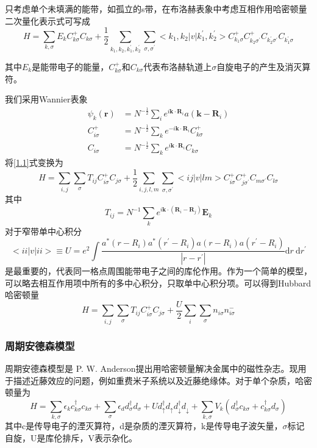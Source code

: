 只考虑单个未填满的能带，如孤立的s带，在布洛赫表象中考虑互相作用哈密顿量二次量化表示式可写成
\begin{equation}
    H=\sum_{k, \sigma} E_{k} C_{k \sigma}^{+} C_{k \sigma}+\frac{1}{2} \sum_{k_{1}, k_{2}, k_{1}^{\prime}, k_{2}^{\prime}} \sum_{\sigma, \sigma^{\prime}}<k_{1}, k_{2}|v| k_{1}^{\prime}, k_{2}^{\prime}>C_{k_{1} \sigma}^{+} C_{k_{2} \sigma^{\prime}}^{+} C_{k^{\prime}_2 \sigma^{\prime}} C_{k^{\prime}_1 \sigma}
    \label{1.1}
\end{equation}

其中$E_k$是能带电子的能量，$C^+_{k \sigma}$和$C_{k \sigma}$代表布洛赫轨道上$\sigma$自旋电子的产生及消灭算符。

我们采用Wannier表象
\begin{align*}
    \psi_k(\textbf{r})&=N^{-\frac{1}{2}}\sum_i e^{i\textbf{k}\cdot \textbf{R}_i} a(\textbf{k} - \textbf{R}_i)\\
    C^+_{i \sigma}&=N^{-\frac{1}{2}} \sum_k e^{- i\textbf{k}\cdot \textbf{R}_i} C^+_{k \sigma}\\
    C_{i \sigma}&=N^{-\frac{1}{2}} \sum_k e^{i\textbf{k}\cdot \textbf{R}_i} C_{k \sigma}
\end{align*}
将\ref{1.1}式变换为
$$
H=\sum_{i, j} \sum_{\sigma} T_{i j} C_{i \sigma}^{+} C_{j \sigma}+\frac{1}{2} \sum_{i, j, l, m} \sum_{\sigma, \sigma^{\prime}}<i j|v| l m>C_{i \sigma}^{+} C_{j \sigma^{\prime}}^{+} C_{m \sigma^{\prime}} C_{l \sigma}
$$
其中
$$T_{ij}=N^{-1}\sum_k e^{i \textbf{k} \cdot (\textbf{R}_i-\textbf{R}_j)}\textbf{E}_k$$
对于窄带单中心积分
$$
<i i|v| i i>\equiv U=e^{2} \int \frac{a^{*}\left(r-R_{i}\right) a^{*}\left(r^{\prime}-R_{i}\right) a\left(r-R_{i}\right) a\left(r^{\prime}-R_{i}\right)}{\left|r-r^{\prime}\right|} \mathrm{d} r \mathrm{~d} r^{\prime}
$$
是最重要的，代表同一格点周围能带电子之间的库伦作用。作为一个简单的模型，可以略去相互作用项中所有的多中心积分，只取单中心积分项。可以得到Hubbard哈密顿量
$$
H=\sum_{i, j} \sum_{\sigma} T_{i j} C_{i \sigma}^{+} C_{j \sigma}+\frac{U}{2} \sum_{i} \sum_{\sigma} n_{i \sigma} n_{i \sigma}^{-}
$$

\subsubsection{周期安德森模型}
周期安德森模型是 P. W. Anderson提出用哈密顿量解决金属中的磁性杂志。现用于描述近藤效应的问题，例如重费米子系统以及近藤绝缘体。对于单个杂质，哈密顿量为
$$
H=\sum_{k, \sigma} \epsilon_{k} c_{k \sigma}^{\dagger} c_{k \sigma}+\sum_{\sigma} \epsilon_{d} d_{\sigma}^{\dagger} d_{\sigma}+U d_{\uparrow}^{\dagger} d_{\uparrow} d_{\downarrow}^{\dagger} d_{\downarrow}+\sum_{k, \sigma} V_{k}\left(d_{\sigma}^{\dagger} c_{k \sigma}+c_{k \sigma}^{\dagger} d_{\sigma}\right)
$$
其中c是传导电子的湮灭算符，d是杂质的湮灭算符，k是传导电子波矢量，$\sigma$标记自旋，U是库伦排斥，V表示杂化。

